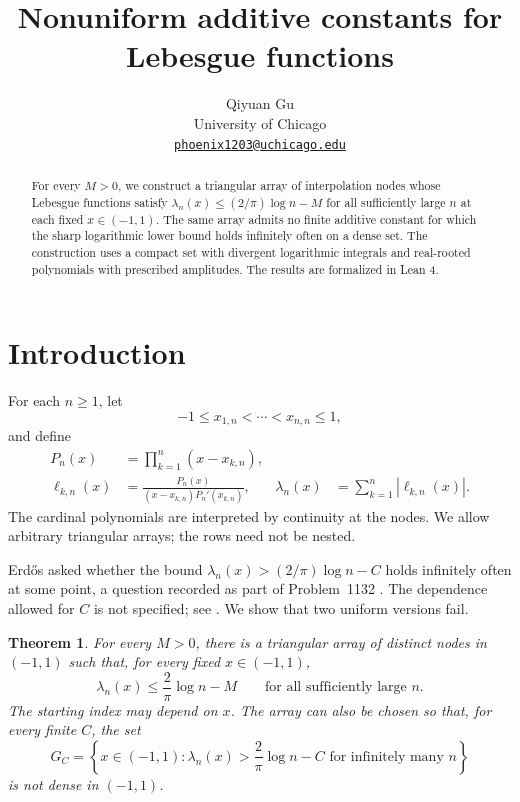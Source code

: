 \documentclass[11pt]{article}
\title{Nonuniform additive constants for Lebesgue functions}
\author{Qiyuan Gu\\
University of Chicago\\
\href{mailto:phoenix1203@uchicago.edu}{\texttt{phoenix1203@uchicago.edu}}}
\date{}
\newtheorem{theorem}{Theorem}
\theoremstyle{remark}
\numberwithin{equation}{section}
\begin{document}
\maketitle

\begin{abstract}
For every \(M>0\), we construct a triangular array of interpolation
nodes whose Lebesgue functions satisfy
\(\lambda_n(x)\le(2/\pi)\log n-M\) for all sufficiently large \(n\)
at each fixed \(x\in(-1,1)\).
The same array admits no finite additive constant for which the sharp
logarithmic lower bound holds infinitely often on a dense set.
The construction uses a compact set with divergent logarithmic
integrals and real-rooted polynomials with prescribed amplitudes.
The results are formalized in Lean 4.
\end{abstract}

\section{Introduction}

For each \(n\ge1\), let
\[
 -1\le x_{1,n}<\cdots<x_{n,n}\le1,
\]
and define
\begin{align*}
 P_n(x)&=\prod_{k=1}^n(x-x_{k,n}),\\
 \ell_{k,n}(x)&=\frac{P_n(x)}{(x-x_{k,n})P_n'(x_{k,n})},
 &\lambda_n(x)&=\sum_{k=1}^n|\ell_{k,n}(x)|.
\end{align*}
The cardinal polynomials are interpreted by continuity at the nodes.
We allow arbitrary triangular arrays; the rows need not be nested.

Erd\H{o}s \cite[p.~68]{Erdos} asked whether the bound
\(\lambda_n(x)>(2/\pi)\log n-C\) holds infinitely often at some
point, a question recorded as part of Problem~1132 \cite{Bloom}.
The dependence allowed for \(C\) is not specified; see
\cite[Remark~1.12]{Tao}.
We show that two uniform versions fail.

\begin{theorem}\label{thm:nonuniform}
For every \(M>0\), there is a triangular array of distinct nodes in
\((-1,1)\) such that, for every fixed \(x\in(-1,1)\),
\begin{equation}\label{eq:counter-eventual}
 \lambda_n(x)\le\frac2\pi\log n-M
 \qquad\text{for all sufficiently large }n.
\end{equation}
The starting index may depend on \(x\). The array can also be chosen
so that, for every finite \(C\), the set
\begin{equation}\label{eq:counter-good-set}
 G_C=\left\{x\in(-1,1):
 \lambda_n(x)>\frac2\pi\log n-C
 \text{ for infinitely many }n\right\}
\end{equation}
is not dense in \((-1,1)\).
\end{theorem}
\end{document}
